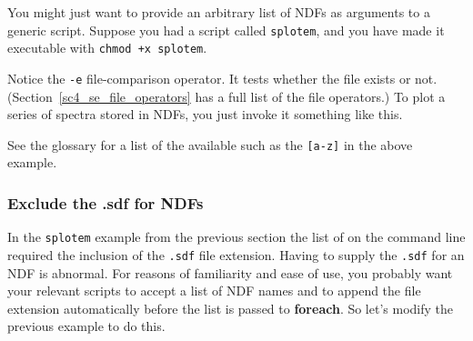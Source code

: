 \documentclass[twoside,11pt,nolof]{starlink}
\providecommand{\latexelsehtml}[2]{#1}
\providecommand{\NDFref}[1]{\xref{#1}{sun33}{}}
\begin{document}
You might just want to provide an arbitrary list of NDFs as arguments to
a generic script.  Suppose you had a script called \texttt{splotem}, and
you have made it executable with \mbox{\texttt{chmod +x splotem}}.

\begin{small}
\end{small}

Notice the \texttt{-e} file-comparison operator.  It tests whether the
file exists or not.  (\latexelsehtml{Section~\ref{sc4_se_file_operators}
has a}{Click \htmlref{here}{sc4_se_file_operators} for a} full list of
the file operators.) To plot a series of spectra stored in NDFs, you
just invoke it something like this.

\begin{small}
\begin{terminalv}
\end{terminalv}
\end{small}

See the glossary for a list of the available
 such as the \texttt{[a-z]} in the
above example.

\subsubsection{Exclude the .sdf for NDFs
\label{sc4_se_wildcard_nosdf}}

In the \latexelsehtml{\texttt{splotem} example from the previous
section}{\htmlref{splotem example}{sc4_se_wildcard_lists}} the list of
\NDFref{\textsf{NDF}s} on the command line required the inclusion of
the \texttt{.sdf} file extension.  Having to supply the \texttt{.sdf} for an
NDF is abnormal.  For reasons of familiarity and ease of use, you
probably want your relevant scripts to accept a list of NDF names and
to append the file extension automatically before the list is passed to
\textbf{foreach}.  \latexelsehtml{So let's modify the
previous example to do this.}{Here is an example.  It is a modified
version of the \texttt{splotem} script.}
\end{document}
